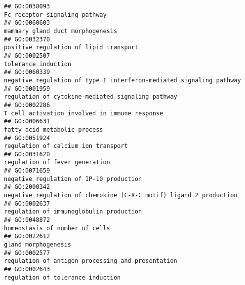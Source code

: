 \documentclass[
]{article}
\begin{document}
\begin{verbatim}
## GO:0038093                                                                                                                    Fc receptor signaling pathway
## GO:0060603                                                                                                                 mammary gland duct morphogenesis
## GO:0032370                                                                                                           positive regulation of lipid transport
## GO:0002507                                                                                                                              tolerance induction
## GO:0060339                                                                              negative regulation of type I interferon-mediated signaling pathway
## GO:0001959                                                                                                regulation of cytokine-mediated signaling pathway
## GO:0002286                                                                                                    T cell activation involved in immune response
## GO:0006631                                                                                                                     fatty acid metabolic process
## GO:0051924                                                                                                              regulation of calcium ion transport
## GO:0031620                                                                                                                   regulation of fever generation
## GO:0071659                                                                                                          negative regulation of IP-10 production
## GO:2000342                                                                               negative regulation of chemokine (C-X-C motif) ligand 2 production
## GO:0002637                                                                                                          regulation of immunoglobulin production
## GO:0048872                                                                                                                   homeostasis of number of cells
## GO:0022612                                                                                                                              gland morphogenesis
## GO:0002577                                                                                                regulation of antigen processing and presentation
## GO:0002643                                                                                                                regulation of tolerance induction

\end{verbatim}
\end{document}
